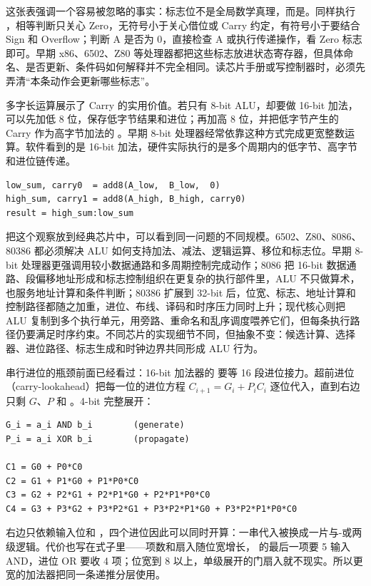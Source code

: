 这张表强调一个容易被忽略的事实：标志位不是全局数学真理，而是。同样执行 ，相等判断只关心 Zero，无符号小于关心借位或 Carry 约定，有符号小于要结合 Sign 和 Overflow；判断 A 是否为 0，直接检查 A 或执行传递操作，看 Zero 标志即可。早期 x86、6502、Z80 等处理器都把这些标志放进状态寄存器，但具体命名、是否更新、条件码如何解释并不完全相同。读芯片手册或写控制器时，必须先弄清“本条动作会更新哪些标志”。

多字长运算展示了 Carry 的实用价值。若只有 8-bit ALU，却要做 16-bit 加法，可以先加低 8 位，保存低字节结果和进位；再加高 8 位，并把低字节产生的 Carry 作为高字节加法的 。早期 8-bit 处理器经常依靠这种方式完成更宽整数运算。软件看到的是 16-bit 加法，硬件实际执行的是多个周期内的低字节、高字节和进位链传递。

\begin{lstlisting}
low_sum, carry0  = add8(A_low,  B_low,  0)
high_sum, carry1 = add8(A_high, B_high, carry0)
result = high_sum:low_sum
\end{lstlisting}

把这个观察放到经典芯片中，可以看到同一问题的不同规模。6502、Z80、8086、80386 都必须解决 ALU 如何支持加法、减法、逻辑运算、移位和标志位。早期 8-bit 处理器更强调用较小数据通路和多周期控制完成动作；8086 把 16-bit 数据通路、段偏移地址形成和标志控制组织在更复杂的执行部件里，ALU 不只做算术，也服务地址计算和条件判断；80386 扩展到 32-bit 后，位宽、标志、地址计算和控制路径都随之加重，进位、布线、译码和时序压力同时上升；现代核心则把 ALU 复制到多个执行单元，用旁路、重命名和乱序调度喂养它们，但每条执行路径仍要满足时序约束。不同芯片的实现细节不同，但抽象不变：候选计算、选择器、进位路径、标志生成和时钟边界共同形成 ALU 行为。

串行进位的瓶颈前面已经看过：16-bit 加法器的  要等 16 段进位接力。超前进位（carry-lookahead）把每一位的进位方程 $C_{i+1} = G_i + P_i C_i$ 逐位代入，直到右边只剩 $G$、$P$ 和 。4-bit 完整展开：

\begin{lstlisting}
G_i = a_i AND b_i        (generate)
P_i = a_i XOR b_i        (propagate)

C1 = G0 + P0*C0
C2 = G1 + P1*G0 + P1*P0*C0
C3 = G2 + P2*G1 + P2*P1*G0 + P2*P1*P0*C0
C4 = G3 + P3*G2 + P3*P2*G1 + P3*P2*P1*G0 + P3*P2*P1*P0*C0
\end{lstlisting}

右边只依赖输入位和 ，四个进位因此可以同时开算：一串代入被换成一片与-或两级逻辑。代价也写在式子里——项数和扇入随位宽增长， 的最后一项要 5 输入 AND，进位 OR 要收 4 项；位宽到 8 以上，单级展开的门扇入就不现实。所以更宽的加法器把同一条递推分层使用。

